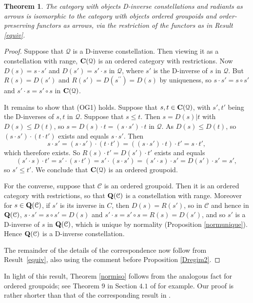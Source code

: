 \documentclass[12pt]{amsart}
\newtheorem{thm}{Theorem}[section]
\theoremstyle{definition}
\newcommand{\Q}{\mathcal Q}
\newcommand{\C}{\mathcal C}
\begin{document}
\begin{thm}  \label{invcorresp} The category with objects D-inverse constellations and  radiants as arrows is isomorphic to the category with objects ordered groupoids and  order-preserving functors as arrows, via the restriction of the functors as in Result \ref{equiv}.
\end{thm}
\begin{proof}
Suppose that $\Q$ is a D-inverse constellation.  Then viewing it as a constellation with range, ${\bf C}(\Q)$ is an ordered category with restrictions.  Now $D(s)=s\cdot s'$ and $D(s')=s'\cdot s$ in $\Q$, where $s'$ is the D-inverse of $s$ in $\Q$.  But $R(s)=D(s')$ and $R(s')=D(s^{\prime\prime})=D(s)$ by uniqueness, so $s\cdot s'=s\circ s'$ and $s'\cdot s=s'\circ s$ in ${\bf C}(\Q)$.  

It remains to show that (OG1) holds.  Suppose that $s,t\in {\bf C}(\Q)$, with $s',t'$ being the D-inverses of $s,t$ in $\Q$.  Suppose that
 $s\leq t$.  Then $s=D(s)|t$ with $D(s)\leq D(t)$, so $s=D(s)\cdot t=(s\cdot s')\cdot t$ in $\Q$. As $D(s)\leq D(t)$, so $(s\cdot s')\cdot (t\cdot t')$ exists and equals $s\cdot s'$. Then
$$s\cdot s'=(s\cdot s')\cdot (t\cdot t')=((s\cdot s')\cdot t)\cdot t'=s\cdot t',$$
which therefore exists. So $R(s)\cdot t'=D(s')\cdot t'$ exists and equals
$$(s'\cdot s)\cdot t'=s'\cdot (s\cdot t')=s'\cdot (s\cdot s')=(s'\cdot s)\cdot s'=D(s')\cdot s'=s',$$
so $s'\leq t'$.  We conclude that ${\bf C}(\Q)$ is an ordered groupoid.
 
For the converse, suppose that $\C$ is an ordered groupoid.  Then it is an ordered category with restrictions, so that ${\bf Q}(\C)$ is a constellation with range.  Moreover for $s\in {\bf Q}(\C)$, if $s'$ is its inverse in $C$, then $D(s)=R(s')$, so in $\C$ and hence in ${\bf Q}(\C)$, $s\cdot s'=s\circ s'=D(s)$ and $s'\cdot s=s'\circ s=R(s)=D(s')$, and so $s'$ is a D-inverse of $s$ in ${\bf Q}(\C)$, which is unique by normality (Proposition \ref{normunique}).  Hence ${\bf Q}(\C)$ is a D-inverse constellation.

The remainder of the details of the correspondence now follow from Result~\ref{equiv}, also using the comment before Proposition \ref{Dregim2}.
\end{proof}

In light of this result, Theorem \ref{normiso} follows from the analogous fact for ordered groupoids; see Theorem 9 in Section $4.1$ of \cite{lawsoninverse} for example.  Our proof is rather shorter than that of the corresponding result in \cite{lawsoninverse}.
\end{document}

